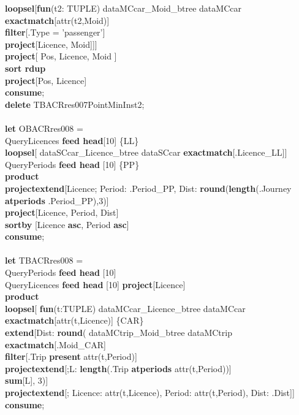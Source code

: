 \documentclass[a4paper]{article}
\newcommand{\op}[1]{\textbf{#1}}
\begin{document}
\begin{scriptsize}
\begin{tabbing}
\>\>\op{loopsel}[\op{fun}(t2: TUPLE) dataMCcar\_Moid\_btree dataMCcar \op{exactmatch}[attr(t2,Moid)]\\
\>\>\>\op{filter}[.Type = 'passenger']\\
\>\>\>\op{project}[Licence, Moid]]]\\
\>\op{project}[ Pos, Licence, Moid ]\\
\>\op{sort rdup}\\
\>\op{project}[Pos, Licence]\\
\op{consume};\\
\op{delete} TBACRres007PointMinInst2;\\
\\
\op{let} OBACRres008 =\\
\>QueryLicences \op{feed head}[10] \{LL\}\\
\>\op{loopsel}[ dataSCcar\_Licence\_btree dataSCcar \op{exactmatch}[.Licence\_LL]]\\
\>QueryPeriods \op{feed head} [10] \{PP\}\\
\>\op{product}\\
\>\op{projectextend}[Licence; Period: .Period\_PP, Dist: \op{round}(\op{length}(.Journey \op{atperiods} .Period\_PP),3)]\\
\>\op{project}[Licence, Period, Dist]\\
\>\op{sortby} [Licence \op{asc}, Period \op{asc}]\\
\op{consume};\\
\\
\op{let} TBACRres008 =\\
\>QueryPeriods \op{feed head} [10]\\
\>QueryLicences \op{feed head} [10] \op{project}[Licence]\\
\>\op{product}\\
\>\op{loopsel}[ \op{fun}(t:TUPLE)    dataMCcar\_Licence\_btree dataMCcar \op{exactmatch}[attr(t,Licence)] \{CAR\}\\
\>\>\op{extend}[Dist: \op{round}(
\>\>\>\>dataMCtrip\_Moid\_btree dataMCtrip \op{exactmatch}[.Moid\_CAR]\\
\>\>\>\>\op{filter}[.Trip \op{present} attr(t,Period)]\\
\>\>\>\>\op{projectextend}[;L: \op{length}(.Trip \op{atperiods} attr(t,Period))]\\
\>\>\>\op{sum}[L], 3)]\\
\>\>\op{projectextend}[; Licence: attr(t,Licence), Period: attr(t,Period), Dist: .Dist]]\\
\op{consume};\\

\end{tabbing}
\end{scriptsize}
\end{document}
